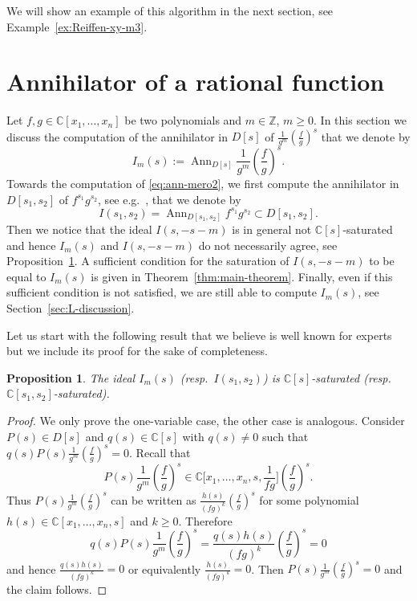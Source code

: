 \documentclass[a4paper,12pt]{amsart}
\theoremstyle{plain}
\newtheorem{prop}[theorem]{Proposition}
\theoremstyle{definition}
\theoremstyle{remark}
\def\CC{\mathbb{C}}
\def\ZZ{\mathbb{Z}}
\DeclareMathOperator{\Ann}{Ann}
\begin{document}
We will show an example of this algorithm in the next section, see Example~\ref{ex:Reiffen-xy-m3}.

\section{Annihilator of a rational function}\label{sec:annhilator}

Let $f,g \in \CC[x_1,\ldots,x_n]$ be two polynomials and $m \in \ZZ$, $m \geq 0$.
In this section we discuss the computation of the annihilator in $D[s]$
of $\frac{1}{g^m} \left( \frac{f}{g} \right)^s$ that we denote by
\begin{equation}\label{eq:ann-mero2}
I_m(s) := \Ann_{D[s]} \frac{1}{g^m} \left( \frac{f}{g} \right)^s.
\end{equation}
Towards the computation of \eqref{eq:ann-mero2}, we first compute the annihilator in $D[s_1,s_2]$ of
$f^{s_1} g^{s_2}$, see e.g.~\cite{OaTa99}, that we denote by
\[
I(s_1,s_2) = \Ann_{D[s_1,s_2]} f^{s_1} g^{s_2} \subset D[s_1,s_2].
\]
Then we notice that the ideal $I(s,-s-m)$ is in general not $\CC[s]$-saturated
and hence $I_m(s)$ and $I(s,-s-m)$ do not necessarily agree, see Proposition~\ref{prop:saturation}.
A sufficient condition for the saturation of $I(s,-s-m)$ to be equal to $I_m(s)$ is given
in Theorem~\ref{thm:main-theorem}. Finally, even if this sufficient condition is not satisfied,
we are still able to compute $I_m(s)$, see Section~\ref{sec:L-discussion}.

Let us start with the following result that we believe is well known for experts but
we include its proof for the sake of completeness.

\begin{prop}\label{prop:saturation}
The ideal $I_m(s)$ (resp.~$I(s_1,s_2)$) is $\CC[s]$-saturated (resp.~$\CC[s_1,s_2]$-saturated).
\end{prop}

\begin{proof}
We only prove the one-variable case, the other case is analogous. Consider $P(s) \in D[s]$ and $q(s) \in \CC[s]$ with
$q(s)\neq 0$ such that $q(s) P(s) \frac{1}{g^m} \left( \frac{f}{g} \right)^s = 0$. Recall that
\[
P(s) \frac{1}{g^m} \left( \frac{f}{g} \right)^s \in \CC\Big[x_1,\ldots,x_n,s,\frac{1}{fg}\Big] \left( \frac{f}{g} \right)^s.
\]
Thus $P(s) \frac{1}{g^m} \left( \frac{f}{g} \right)^s$ can be written as
$\frac{h(s)}{(fg)^k} \left( \frac{f}{g} \right)^s$ for some
polynomial $h(s) \in \CC[x_1,\ldots,x_n,s]$ and $k \geq 0$. Therefore
\[
q(s) P(s) \frac{1}{g^m} \left( \frac{f}{g} \right)^s
= \frac{q(s) h(s)}{(fg)^k} \left( \frac{f}{g} \right)^s
= 0
\]
and hence $\frac{q(s) h(s)}{(fg)^k} = 0$ or equivalently $\frac{h(s)}{(fg)^k} = 0$.
Then $P(s) \frac{1}{g^m} \left( \frac{f}{g} \right)^s = 0$ and the claim follows.
\end{proof}
\end{document}
